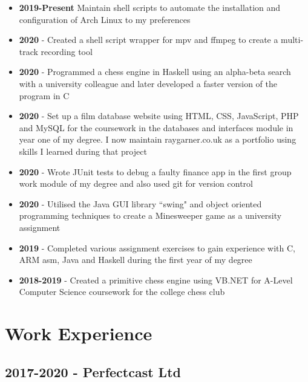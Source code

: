\documentclass{article}
\begin{document}
\begin{itemize}[noitemsep]

\item \textbf{2019-Present} Maintain shell scripts to automate the installation and configuration of Arch Linux to my preferences 
\item \textbf{2020} - Created a shell script wrapper for mpv and ffmpeg to create a multi-track recording tool
\item \textbf{2020} - Programmed a chess engine in Haskell using an alpha-beta search with a university colleague and later developed a faster version of the program in C
\item \textbf{2020} - Set up a film database website using HTML, CSS, JavaScript, PHP and MySQL for the coursework in the databases and interfaces module in year one of my degree. I now maintain raygarner.co.uk as a portfolio using skills I learned during that project
\item \textbf{2020} - Wrote JUnit tests to debug a faulty finance app in the first group work module of my degree and also used git for version control
\item \textbf{2020} - Utilised the Java GUI library ``swing" and object oriented programming techniques to create a Minesweeper game as a university assignment
\item \textbf{2019} - Completed various assignment exercises to gain experience with C, ARM asm, Java and Haskell during the first year of my degree
\item \textbf{2018-2019} - Created a primitive chess engine using VB.NET for A-Level Computer Science coursework for the college chess club

\end{itemize}





\section{Work Experience}
\subsection{2017-2020 - Perfectcast Ltd}

\end{document}
